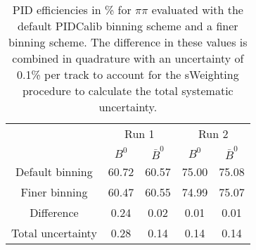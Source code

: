 \begin{table}
    \centering
    \begin{tabular}{ccccc}
    \toprule
& \multicolumn{2}{c}{Run 1} & \multicolumn{2}{c}{Run 2}\\
& $B^0$ & $\bar{B}^0$ & $B^0$ & $\bar{B}^0$\\
    \midrule
Default binning & 60.72 & 60.57 & 75.00 & 75.08\\
Finer binning & 60.47 & 60.55 & 74.99 & 75.07\\
Difference & 0.24 & 0.02 & 0.01 & 0.01\\
Total uncertainty & 0.28 & 0.14 & 0.14 & 0.14\\
    \bottomrule
    \end{tabular}
    \caption{PID efficiencies in \% for $\pi\pi$ evaluated with the default PIDCalib binning scheme and a finer binning scheme. The difference in these values is combined in quadrature with an uncertainty of 0.1\% per track to account for the sWeighting procedure to calculate the total systematic uncertainty.}
\label{tab:final_PID_pipi}
\end{table}
